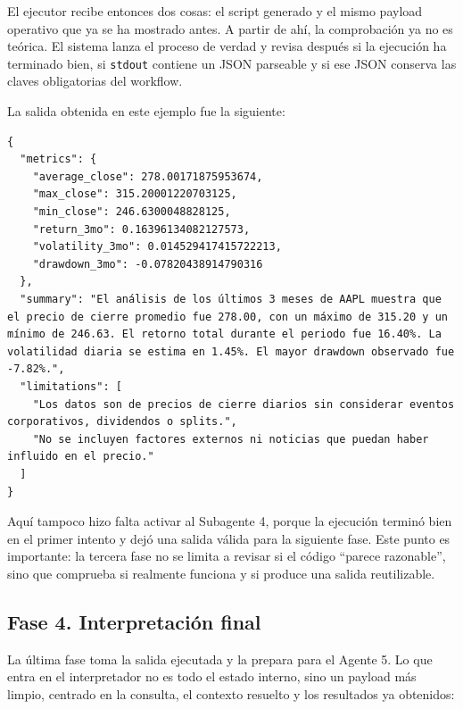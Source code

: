 El ejecutor recibe entonces dos cosas: el script generado y el mismo payload operativo que ya se ha mostrado antes. A partir de ah\'i, la comprobaci\'on ya
no es te\'orica. El sistema lanza el proceso de verdad y revisa despu\'es si la ejecuci\'on ha terminado bien, si \texttt{stdout} contiene un JSON parseable y si
ese JSON conserva las claves obligatorias del workflow.

La salida obtenida en este ejemplo fue la siguiente:

\begin{lstlisting}[style=traceblock]
{
  "metrics": {
    "average_close": 278.00171875953674,
    "max_close": 315.20001220703125,
    "min_close": 246.6300048828125,
    "return_3mo": 0.16396134082127573,
    "volatility_3mo": 0.014529417415722213,
    "drawdown_3mo": -0.07820438914790316
  },
  "summary": "El análisis de los últimos 3 meses de AAPL muestra que el precio de cierre promedio fue 278.00, con un máximo de 315.20 y un mínimo de 246.63. El retorno total durante el periodo fue 16.40%. La volatilidad diaria se estima en 1.45%. El mayor drawdown observado fue -7.82%.",
  "limitations": [
    "Los datos son de precios de cierre diarios sin considerar eventos corporativos, dividendos o splits.",
    "No se incluyen factores externos ni noticias que puedan haber influido en el precio."
  ]
}
\end{lstlisting}

Aqu\'i tampoco hizo falta activar al Subagente 4, porque la ejecuci\'on termin\'o bien en el primer intento y dej\'o una salida v\'alida para la siguiente fase.
Este punto es importante: la tercera fase no se limita a revisar si el c\'odigo ``parece razonable'', sino que comprueba si realmente funciona y si produce una
salida reutilizable.

\subsection{Fase 4. Interpretaci\'on final}

La \'ultima fase toma la salida ejecutada y la prepara para el Agente 5. Lo que entra en el interpretador no es todo el estado interno, sino un payload m\'as
limpio, centrado en la consulta, el contexto resuelto y los resultados ya obtenidos:

